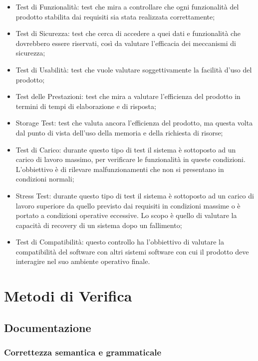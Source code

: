 \begin{itemize}
  \item Test di Funzionalit\`a: test che mira a controllare che ogni
  funzionalit\`a del prodotto stabilita dai requisiti sia stata realizzata correttamente;
  \item Test di Sicurezza: test che cerca di accedere a quei dati e
  funzionalit\`a che dovrebbero essere riservati, cos\`i da valutare l'efficacia dei meccanismi di sicurezza;
  \item Test di Usabilit\`a:  test che vuole valutare soggettivamente la facilit\`a
  d'uso del prodotto;
  \item Test delle Prestazioni: test che mira a valutare l'efficienza del
  prodotto in termini di tempi di elaborazione e di risposta;
  \item Storage Test: test che valuta ancora l'efficienza del
  prodotto, ma questa volta dal punto di vista dell'uso della memoria e della
  richiesta di risorse;
  \item Test di Carico: durante questo tipo di test il sistema \`e sottoposto ad
  un carico di lavoro massimo, per verificare le funzionalit\`a in queste
  condizioni. L'obbiettivo \`e di rilevare malfunzionamenti che non si presentano in condizioni normali;
  \item Stress Test: durante questo tipo di test il sistema \`e sottoposto ad un
  carico di lavoro superiore da quello previsto dai requisiti in condizioni
  massime o \`e portato a condizioni operative eccessive. Lo scopo \`e quello di valutare la capacit\`a di recovery di un sistema dopo un fallimento;
  \item Test di Compatibilit\`a: questo controllo ha l'obbiettivo di valutare la
  compatibilit\`a del software con altri sistemi software con cui il prodotto deve interagire nel suo ambiente operativo finale.
 \end{itemize}


\section{Metodi di Verifica}

\subsection{Documentazione}

\subsubsection*{Correttezza semantica e grammaticale}

